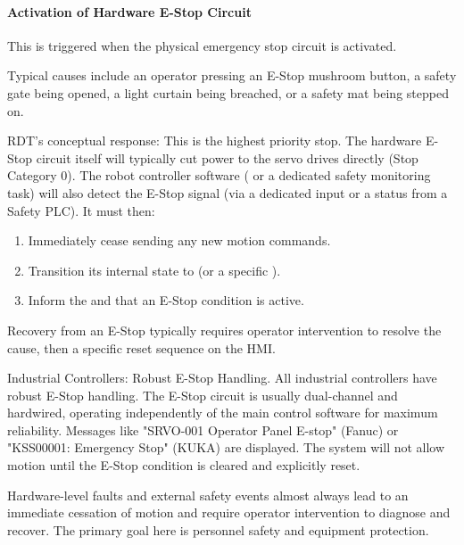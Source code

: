 \paragraph{Activation of Hardware E-Stop Circuit}
This is triggered when the physical emergency stop circuit is activated.

Typical causes include an operator pressing an E-Stop mushroom button, a safety gate being opened, a light curtain being breached, or a safety mat being stepped on.

RDT's conceptual response: This is the highest priority stop. The hardware E-Stop circuit itself will typically cut power to the servo drives directly (Stop Category 0). The robot controller software ( or a dedicated safety monitoring task) will also detect the E-Stop signal (via a dedicated input or a status from a Safety PLC). It must then:
\begin{enumerate}
    \item Immediately cease sending any new motion commands.
    \item Transition its internal state to  (or a specific ).
    \item Inform the  and  that an E-Stop condition is active.
\end{enumerate}
Recovery from an E-Stop typically requires operator intervention to resolve the cause, then a specific reset sequence on the HMI.

\begin{principlebox}{Industrial Controllers: Robust E-Stop Handling.}
    All industrial controllers have robust E-Stop handling. The E-Stop circuit is usually dual-channel and hardwired, operating independently of the main control software for maximum reliability. Messages like "SRVO-001 Operator Panel E-stop" (Fanuc) or "KSS00001: Emergency Stop" (KUKA) are displayed. The system will not allow motion until the E-Stop condition is cleared and explicitly reset.
\end{principlebox}

Hardware-level faults and external safety events almost always lead to an immediate cessation of motion and require operator intervention to diagnose and recover. The primary goal here is personnel safety and equipment protection.

